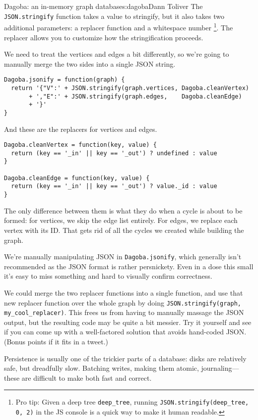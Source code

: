 \begin{aosachapter}{Dagoba: an in-memory graph database}{s:dagoba}{Dann Toliver}
The \texttt{JSON.stringify} function takes a value to stringify, but it
also takes two additional parameters: a replacer function and a
whitespace number \footnote{Pro tip: Given a deep tree
  \texttt{deep\_tree}, running \texttt{JSON.stringify(deep\_tree, 0, 2)}
  in the JS console is a quick way to make it human readable.}. The
replacer allows you to customize how the stringification proceeds.

We need to treat the vertices and edges a bit differently, so we're
going to manually merge the two sides into a single JSON string.

\begin{verbatim}
Dagoba.jsonify = function(graph) {
  return '{"V":' + JSON.stringify(graph.vertices, Dagoba.cleanVertex)
       + ',"E":' + JSON.stringify(graph.edges,    Dagoba.cleanEdge)
       + '}'
}
\end{verbatim}

And these are the replacers for vertices and edges.

\begin{verbatim}
Dagoba.cleanVertex = function(key, value) {
  return (key == '_in' || key == '_out') ? undefined : value
}

Dagoba.cleanEdge = function(key, value) {
  return (key == '_in' || key == '_out') ? value._id : value
}
\end{verbatim}

The only difference between them is what they do when a cycle is about
to be formed: for vertices, we skip the edge list entirely. For edges,
we replace each vertex with its ID. That gets rid of all the cycles we
created while building the graph.

We're manually manipulating JSON in \texttt{Dagoba.jsonify}, which
generally isn't recommended as the JSON format is rather persnickety.
Even in a dose this small it's easy to miss something and hard to
visually confirm correctness.

We could merge the two replacer functions into a single function, and
use that new replacer function over the whole graph by doing
\texttt{JSON.stringify(graph, my\_cool\_replacer)}. This frees us from
having to manually massage the JSON output, but the resulting code may
be quite a bit messier. Try it yourself and see if you can come up with
a well-factored solution that avoids hand-coded JSON. (Bonus points if
it fits in a tweet.)

\label{persistence}

Persistence is usually one of the trickier parts of a database: disks
are relatively safe, but dreadfully slow. Batching writes, making them
atomic, journaling---these are difficult to make both fast and correct.


\end{aosachapter}
